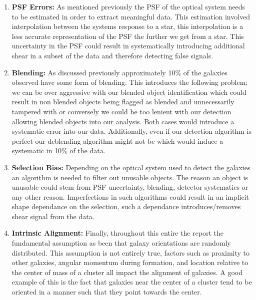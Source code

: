 \documentclass{article}
\begin{document}
\begin{enumerate}
    \item \textbf{PSF Errors:} As mentioned previously the PSF of the optical system needs to be estimated in order to extract meaningful data. This estimation involved interpolation between the systems response to a star, this interpolation is a less accurate representation of the PSF the further we get from a star. This uncertainty in the PSF could result in systematically introducing additional shear in a subset of the data and therefore detecting false signals. 
    \item \textbf{Blending:} As discussed previously approximately 10\% of the galaxies observed have some form of blending. This introduces the following problem; we can be over aggressive with our blended object identification which could result in non blended objects being flagged as blended and unnecessarily tampered with or conversely we could be too lenient with our detection allowing blended objects into our analysis. Both cases would introduce a systematic error into our data. Additionally, even if our detection algorithm is perfect our deblending algorithm might not be which would induce a systematic in 10\% of the data.
    \item \textbf{Selection Bias:} Depending on the optical system used to detect the galaxies an algorithm is needed to filter out unusable objects. The reason an object is unusable could stem from PSF uncertainty, blending, detector systematics or any other reason. Imperfections in such algorithms could result in an implicit shape dependance on the selection, such a dependance introduces/removes shear signal from the data.
    \item \textbf{Intrinsic Alignment:} Finally, throughout this entire the report the fundamental assumption as been that galaxy orientations are randomly distributed. This assumption is not entirely true, factors such as proximity to other galaxies, angular momentum during formation, and location relative to the center of mass of a cluster all impact the alignment of galaxies. A good example of this is the fact that galaxies near the center of a cluster tend to be oriented in a manner such that they point towards the center\cite{rachel_2018}.
\end{enumerate}



\end{document}
